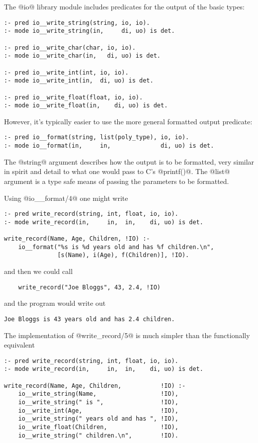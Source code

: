 The @io@ library module includes predicates for the output
of the basic types:
\begin{verbatim}
:- pred io__write_string(string, io, io).
:- mode io__write_string(in,     di, uo) is det.

:- pred io__write_char(char, io, io).
:- mode io__write_char(in,   di, uo) is det.

:- pred io__write_int(int, io, io).
:- mode io__write_int(in,  di, uo) is det.

:- pred io__write_float(float, io, io).
:- mode io__write_float(in,    di, uo) is det.
\end{verbatim}
However, it's typically easier to use the more general
formatted output predicate:
\begin{verbatim}
:- pred io__format(string, list(poly_type), io, io).
:- mode io__format(in,     in,              di, uo) is det.
\end{verbatim}
The @string@ argument describes how the output is to be formatted, very
similar in spirit and detail to what one would pass to C's @printf()@.
The @list@ argument is a type safe means of passing the parameters to be
formatted.

Using @io__format/4@ one might write
\begin{verbatim}
:- pred write_record(string, int, float, io, io).
:- mode write_record(in,     in,  in,    di, uo) is det.

write_record(Name, Age, Children, !IO) :-
    io__format("%s is %d years old and has %f children.\n",
               [s(Name), i(Age), f(Children)], !IO).
\end{verbatim}
and then we could call
\begin{verbatim}
    write_record("Joe Bloggs", 43, 2.4, !IO)
\end{verbatim}
and the program would write out
\begin{verbatim}
Joe Bloggs is 43 years old and has 2.4 children.
\end{verbatim}
The implementation of @write_record/5@ is much simpler than the
functionally equivalent
\begin{verbatim}
:- pred write_record(string, int, float, io, io).
:- mode write_record(in,     in,  in,    di, uo) is det.

write_record(Name, Age, Children,           !IO) :-
    io__write_string(Name,                  !IO),
    io__write_string(" is ",                !IO),
    io__write_int(Age,                      !IO),
    io__write_string(" years old and has ", !IO),
    io__write_float(Children,               !IO),
    io__write_string(" children.\n",        !IO).
\end{verbatim}

